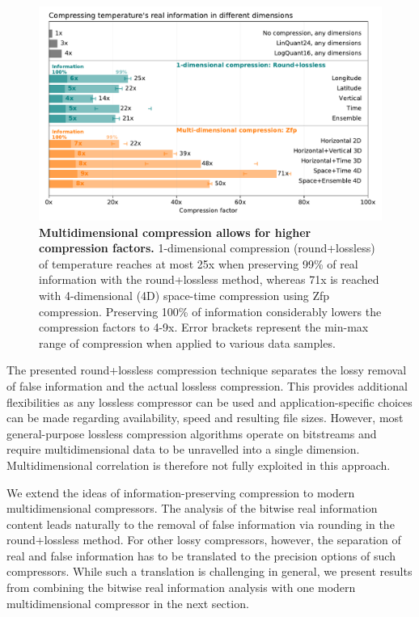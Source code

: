 \begin{figure}[tbhp]
	\includegraphics[width=1\textwidth]{Figures/compression/compressfac_comparison.pdf}
	\caption{\textbf{Multidimensional compression allows for higher compression factors.}
	\mbox{1-dimensional} compression (round+lossless) of temperature reaches at most 25x when preserving 99\% 
	of real information with the round+lossless method, whereas 71x is reached with 4-dimensional (4D)
	space-time compression using Zfp compression. Preserving 100\% of information considerably lowers
	the compression factors to 4-9x. Error brackets represent the min-max range of compression when
	applied to various data samples.}
	\label{fig:compressfac_comparison}
\end{figure}

The presented round+lossless compression technique separates the lossy removal of false information and the actual lossless
compression. This provides additional flexibilities as any lossless compressor can be used and application-specific choices can
be made regarding availability, speed and resulting file sizes. However, most general-purpose lossless compression algorithms
operate on bitstreams and require multidimensional data to be unravelled into a single dimension. Multidimensional correlation
is therefore not fully exploited in this approach.

We extend the ideas of information-preserving compression to modern multidimensional compressors. The analysis of the bitwise
real information content leads naturally to the removal of false information via rounding in the round+lossless method. For other
lossy compressors, however, the separation of real and false information has to be translated to the precision options of such
compressors. While such a translation is challenging in general, we present results from combining the bitwise real information
analysis with one modern multidimensional compressor in the next section.

